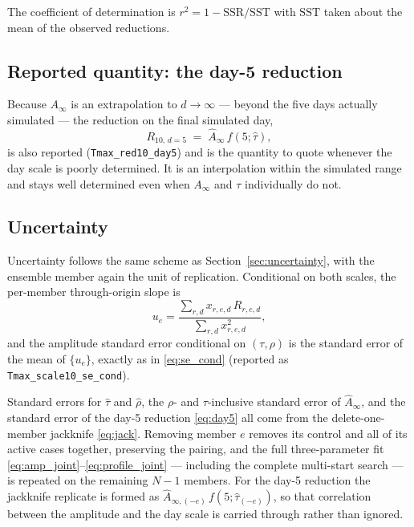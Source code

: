 \documentclass[11pt]{article}
\begin{document}
The coefficient of determination is $r^2 = 1 - \mathrm{SSR}/\mathrm{SST}$ with
$\mathrm{SST}$ taken about the mean of the observed reductions.

\subsection{Reported quantity: the day-5 reduction}

Because $A_\infty$ is an extrapolation to $d\to\infty$ --- beyond the five days
actually simulated --- the reduction on the final simulated day,
\begin{equation}
  R_{10,\,d=5} \;=\; \widehat{A}_\infty\, f(5;\widehat{\tau}),
  \label{eq:day5}
\end{equation}
is also reported (\texttt{Tmax\_red10\_day5}) and is the quantity to quote whenever
the day scale is poorly determined. It is an interpolation within the simulated
range and stays well determined even when $A_\infty$ and $\tau$ individually do
not.

\subsection{Uncertainty}

Uncertainty follows the same scheme as Section~\ref{sec:uncertainty}, with the
ensemble member again the unit of replication. Conditional on both scales, the
per-member through-origin slope is
\begin{equation}
  u_e = \frac{\sum_{r,d} x_{r,e,d}\, R_{r,e,d}}{\sum_{r,d} x_{r,e,d}^{2}},
\end{equation}
and the amplitude standard error conditional on $(\tau,\rho)$ is the standard error
of the mean of $\{u_e\}$, exactly as in \eqref{eq:se_cond} (reported as
\texttt{Tmax\_scale10\_se\_cond}).

Standard errors for $\widehat{\tau}$ and $\widehat{\rho}$, the $\rho$- and
$\tau$-inclusive standard error of $\widehat{A}_\infty$, and the standard error of
the day-5 reduction \eqref{eq:day5} all come from the delete-one-member jackknife
\eqref{eq:jack}. Removing member $e$ removes its control and all of its active
cases together, preserving the pairing, and the full three-parameter fit
\eqref{eq:amp_joint}--\eqref{eq:profile_joint} --- including the complete
multi-start search --- is repeated on the remaining $N-1$ members. For the day-5
reduction the jackknife replicate is formed as
$\widehat{A}_{\infty,(-e)}\, f(5;\widehat{\tau}_{(-e)})$, so that correlation
between the amplitude and the day scale is carried through rather than ignored.
\end{document}
